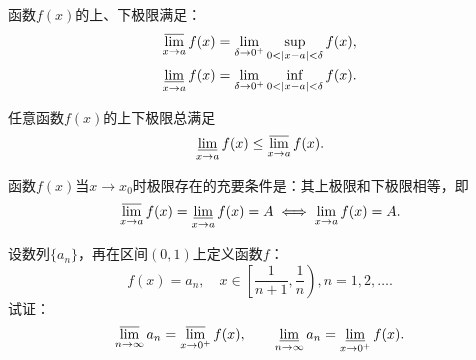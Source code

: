 \begin{property}
函数\(f(x)\)的上、下极限满足：\begin{gather}
\varlimsup\limits_{x \to a} f(x) = \lim\limits_{\delta\to0^+} \sup\limits_{0<\abs{x-a}<\delta} f(x), \\
\varliminf\limits_{x \to a} f(x) = \lim\limits_{\delta\to0^+} \inf\limits_{0<\abs{x-a}<\delta} f(x).
\end{gather}
\end{property}

\begin{theorem}
任意函数\(f(x)\)的上下极限总满足\[
\varliminf\limits_{x \to a} f(x) \leq \varlimsup\limits_{x \to a} f(x).
\]
\end{theorem}

\begin{theorem}
函数\(f(x)\)当\(x \to x_0\)时极限存在的充要条件是：其上极限和下极限相等，即\[
\varlimsup\limits_{x \to a} f(x) = \varliminf\limits_{x \to a} f(x) = A
\iff
\lim\limits_{x \to a} f(x) = A.
\]
\end{theorem}

\begin{example}
设数列\(\{a_n\}\)，再在区间\((0,1)\)上定义函数\(f\)：\[
f(x) = a_n, \quad x\in\left[\frac{1}{n+1},\frac{1}{n}\right), n=1,2,\dotsc.
\]试证：\[
\varlimsup\limits_{n\to\infty} a_n
= \varlimsup\limits_{x\to0^+} f(x),
\qquad
\varliminf\limits_{n\to\infty} a_n
= \varliminf\limits_{x\to0^+} f(x).
\]
\end{example}

